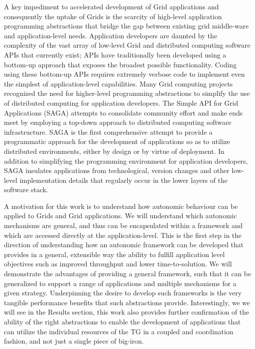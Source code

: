 \documentclass{sig-alternate}
\begin{document}
A key impediment to accelerated development of Grid applications and
consequently the uptake of Grids is the scarcity of high-level
application programming abstractions that bridge the gap between
existing grid middle-ware and application-level needs.  Application
developers are daunted by the complexity of the vast array of
low-level Grid and distributed computing software APIs that currently
exist; APIs have traditionally been developed using a bottom-up
approach that exposes the broadest possible functionality.  Coding
using these bottom-up APIs requires extremely verbose code to
implement even the simplest of application-level capabilities.  Many
Grid computing projects~\cite{realitygrid, gat, cog} recognized the
need for higher-level programming abstractions to simplify the use of
distributed computing for application developers.  The Simple API for
Grid Applications (SAGA) attempts to consolidate community effort and
make ends meet by employing a top-down approach to distributed
computing software infrastructure.  SAGA is the first comprehensive
attempt to provide a programmatic approach for the development of
applications so as to utilize distributed environments, either by
design or by virtue of deployment.  In addition to simplifying the
programming environment for application developers, SAGA insulates
applications from technological, version changes and other low-level
implementation details that regularly occur in the lower layers of the
software stack.

A motivation for this work is to understand how autonomic behaviour can be applied to Grids and Grid applications. We will understand which autonomic mechanisms are general, and thus can be encapsulated within a framework and which are accessed directly at the application-level. This is the first step in the direction of understanding how an autonomic framework can be developed that provides in a general, extensible way the ability to fulfill application level objectives such as improved throughput and lower time-to-solution. We will demonstrate the advantages of providing a general framework, such that it can be generalized to support a range of applications and multiple mechanisms for a given strategy. Underpinning the desire to develop such frameworks is the very tangible performance benefits that such abstractions provide.  Interestingly, we we will see in the Results section, this work also provides further confirmation of the ability of the right abstractions to enable the development of applications that can utilize the individual resources of the TG in a coupled and coordination fashion, and not just a single piece of big-iron.
\end{document}
